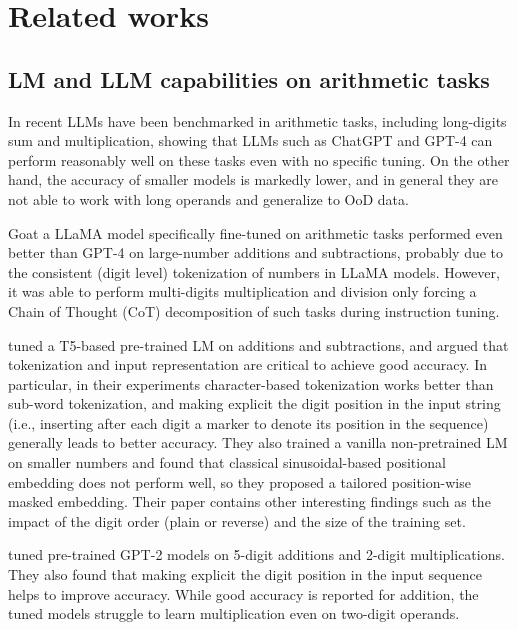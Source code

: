 \documentclass[final,1p,times,authoryear]{elsarticle}
\begin{document}
\section{Related works} \label{sec:RelatedWorks}

\subsection{LM and LLM capabilities on arithmetic tasks}

In \citet{Yuan2023} recent LLMs have been benchmarked in arithmetic tasks, including long-digits sum and multiplication, showing that LLMs such as ChatGPT and GPT-4 can perform reasonably well on these tasks even with no specific tuning. On the other hand, the accuracy of smaller models is markedly lower, and in general they are not able to work with long operands and generalize to OoD data.

Goat \citep{Liu2023} a LLaMA model specifically fine-tuned on arithmetic tasks performed even better than GPT-4 on large-number additions and subtractions, probably due to the consistent (digit level) tokenization of numbers in LLaMA models. However, it was able to perform multi-digits multiplication and division only forcing a Chain of Thought (CoT) \citep{Wei2023} decomposition of such tasks during instruction tuning.

\citet{Nogueira2021} tuned a T5-based pre-trained LM on additions and subtractions, and argued that tokenization and input representation are critical to achieve good accuracy. In particular, in their experiments character-based tokenization works better than sub-word tokenization, and making explicit the digit position in the input string (i.e., inserting after each digit a marker to denote its position in the sequence) generally leads to better accuracy. They also trained a vanilla non-pretrained LM on smaller numbers and found that classical sinusoidal-based positional embedding does not perform well, so they proposed a tailored position-wise masked embedding. Their paper contains other interesting findings such as the impact of the digit order (plain or reverse) and the size of the training set.

\citet{Muffo2023} tuned pre-trained GPT-2 models on 5-digit additions and 2-digit multiplications. They also found that making explicit the digit position in the input sequence helps to improve accuracy. While good accuracy is reported for addition, the tuned models struggle to learn multiplication even on two-digit operands.
\end{document}
